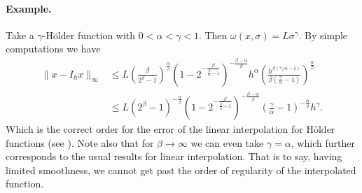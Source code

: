 \documentclass[12pt,a4paper]{article}
\begin{document}
\paragraph{Example.} Take a $\gamma$-H\"older function with $0<\alpha<\gamma<1$. Then $\omega(x,\sigma) = L \sigma^\gamma$. By simple computations we have
\begin{equation}
	\begin{split}
		\|x - I_h x\|_\infty 
		&\leq L\left(\frac{\beta}{2^{\beta}-1}\right)^\frac{\alpha}{\beta} \left(1-2^{-\frac{\beta}{\frac{\beta}{\alpha}-1}}\right)^{-\frac{\beta - \alpha}{\beta}}h^\alpha \left(\frac{h^{\beta(\gamma/\alpha-1)}}{\beta(\frac{\gamma}{\alpha}-1)}\right)^\frac{\alpha}{\beta}\\
		&\leq L\left(2^{\beta}-1\right)^{-\frac{\alpha}{\beta}} \left(1-2^{-\frac{\beta}{\frac{\beta}{\alpha}-1}}\right)^{-\frac{\beta - \alpha}{\beta}}\left(\frac{\gamma}{\alpha}-1\right)^{-\frac{\alpha}{\beta}}h^{\gamma}.
	\end{split}
\end{equation}
Which is the correct order for the error of the linear interpolation for H\"older functions (see \cite{okrasinska2025functional}). Note also that for $\beta\rightarrow\infty$ we can even take $\gamma = \alpha$, which further corresponds to the usual results for linear interpolation. That is to say, having limited smoothness, we cannot get past the order of regularity of the interpolated function. 
\end{document}
